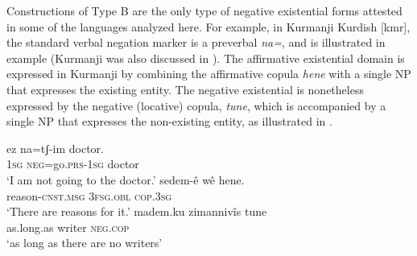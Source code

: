 \documentclass[output=paper,colorlinks,citecolor=brown]{langscibook}
\begin{document}
Constructions of Type B are the only type of negative existential forms
attested in some of the languages analyzed here. For example, in
Kurmanji Kurdish [kmr], the standard verbal negation marker is
a preverbal \textit{na=}, and is illustrated in example
 (Kurmanji was also discussed in
). The affirmative existential domain is expressed in
Kurmanji by combining the affirmative copula \textit{hene} with a single NP
that expresses the existing entity. The negative existential is nonetheless
expressed by the negative (locative) copula, \textit{tune}, which is
accompanied by a single NP that expresses the non-existing entity, as
illustrated in .
%
\begin{exe}\ex
{}
\begin{xlist}
\ex\label{ex:ieur-kurmanji-doctor}
    \gll ez na=tʃ-im doctor. \\
\textsc{1sg}   \textsc{neg}=go.\textsc{prs-1sg}    doctor \\
    \glt `I am not going to the doctor.'
\ex
\gll sedem-ê wê hene.\\
reason-\textsc{cnst}.\textsc{msg}   \textsc{3fsg}.\textsc{obl}
\textsc{cop}.\textsc{3sg}\\
\glt `There are reasons for it.'
\ex\label{ex:ieur-kurmanji-nowriters}
\gll madem.ku zimannivîs tune \\
as.long.as  writer \textsc{neg.cop}\\
\glt `as long as there are no writers'
\end{xlist}\end{exe}
\end{document}
